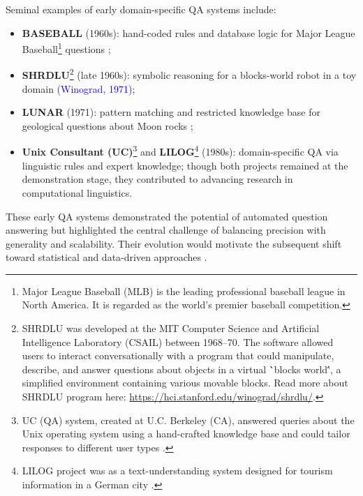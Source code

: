 \begin{spacing}{1.5}
Seminal examples of early domain-specific QA systems include:
\begin{itemize}
    \item \textbf{BASEBALL} (1960s): hand-coded rules and database logic for Major League Baseball\footnote{Major League Baseball (MLB) is the leading professional baseball league in North America. It is regarded as the world’s premier baseball competition.} questions \citep{green_baseball_1961};
    \item \textbf{SHRDLU}\footnote{SHRDLU was developed at the MIT Computer Science and Artificial Intelligence Laboratory (CSAIL) between 1968--70. The software allowed users to interact conversationally with a program that could manipulate, describe, and answer questions about objects in a virtual \``blocks world\'', a simplified environment containing various movable blocks. Read more about SHRDLU program here: \url{https://hci.stanford.edu/winograd/shrdlu/}.} (late 1960s): symbolic reasoning for a blocks-world robot in a toy domain \textcolor{blue}{(Winograd, 1971)};
    \item \textbf{LUNAR} (1971): pattern matching and restricted knowledge base for geological questions about Moon rocks \citep{woods_lunar_1972};
    \item \textbf{Unix Consultant (UC)}\footnote{UC (QA) system, created at U.C. Berkeley (CA), answered queries about the Unix operating system using a hand-crafted knowledge base and could tailor responses to different user types \citep{robert_berkeley_1988}.}  and \textbf{LILOG}\footnote{LILOG project was as a text-understanding system designed for tourism information in a German city \citep{noauthor_question_2025}.} (1980s): domain-specific QA via linguistic rules and expert knowledge; though both projects remained at the demonstration stage, they contributed to advancing research in computational linguistics.
\end{itemize}

These early QA systems demonstrated the potential of automated question answering but highlighted the central challenge of balancing precision with generality and scalability. Their evolution would motivate the subsequent shift toward statistical and data-driven approaches \citep{jurafsky_chapter_2024, antoniou_survey_2022}.


\end{spacing}
